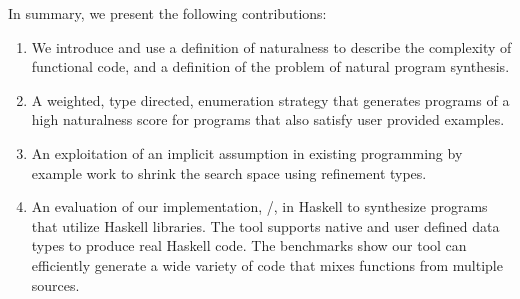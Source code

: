 In summary, we present the following contributions:

\begin{enumerate}
\item We introduce and use a definition of naturalness to describe the complexity of functional code, and a definition of the problem of natural program synthesis.
\item A weighted, type directed, enumeration strategy that generates programs of a high naturalness score for programs that also satisfy user provided examples. 
\item An exploitation of an implicit assumption in existing programming by example work to shrink the search space using refinement types.
\item An evaluation of our implementation, \ourTool/, in Haskell to synthesize programs that utilize Haskell libraries. The tool supports native and user defined data types to produce real Haskell code. The benchmarks show our tool can efficiently generate a wide variety of code that mixes functions from multiple sources.
\end{enumerate}
